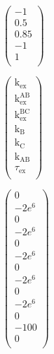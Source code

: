 \documentclass[a4paper,11pt,twoside,openright]{book}
\def\lthtmlcheckvsize{\ifdim\ht\sizebox<\vsize 
  \ifdim\wd\sizebox<\hsize\expandafter\hfill\fi \expandafter\vfill
  \else\expandafter\vss\fi}%
\begin{document}
{\newpage\clearpage
{}%
$\displaystyle \begin{pmatrix}
-1 \\
0.5 \\
0.85 \\
-1 \\
1 \\
\end{pmatrix}$%
\lthtmlindisplaymathZ
\lthtmlcheckvsize\clearpage}

{\newpage\clearpage
{}%
$\displaystyle \begin{pmatrix}
\textrm{k}_{\textrm{ex}}\\
\textrm{k}_{\textrm{ex}}^{\textrm{AB}}\\
\textrm{k}_{\textrm{ex}}^{\textrm{BC}}\\
\textrm{k}_{\textrm{B}}\\
\textrm{k}_{\textrm{C}}\\
\textrm{k}_{\textrm{AB}}\\
\tau_{\textrm{ex}}\\
\end{pmatrix}$%
\lthtmlindisplaymathZ
\lthtmlcheckvsize\clearpage}

{\newpage\clearpage
{}%
$\displaystyle \begin{pmatrix}
0 \\
-2e^6 \\
0 \\
-2e^6 \\
0 \\
-2e^6 \\
0 \\
-2e^6 \\
0 \\
-2e^6 \\
0 \\
-100 \\
0 \\
\end{pmatrix}$%
\lthtmlindisplaymathZ
\lthtmlcheckvsize\clearpage}
\end{document}
